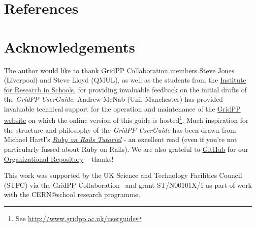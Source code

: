 \documentclass[12pt,a4paper]{iopart}
\begin{document}
\clearpage

%
%
\section*{References}


%

\newpage

\section*{Acknowledgements}
\label{sec:ack}
The author would like to thank GridPP Collaboration members Steve Jones
(Liverpool) and Steve Lloyd (QMUL), as well as the students from the
\href{http://researchinschools.org}{Institute for Research in Schools},
for providing invaluable feedback on the initial drafts of the
\emph{GridPP UserGuide}.
Andrew McNab (Uni. Manchester) has provided invaluable technical support
for the operation and maintenance of the
\href{http://www.gridpp.ac.uk}{GridPP website} on which the online
version of this guide is hosted\footnote{%
See \href{http://www.gridpp.ac.uk/userguide}{http://www.gridpp.ac.uk/userguide}}.
%
Much inspiration for the structure and
philosophy of the \emph{GridPP UserGuide} has been drawn from Michael
Hartl's \emph{\href{https://ww.railstutorial.org}{Ruby on Rails
Tutorial}} - an excellent read (even if you're not particularly fussed
about Ruby on Rails). We are also grateful to
\href{http://github.com}{GitHub} for our
\href{http://github.com/gridpp}{Organizational Repository} -- thanks!

This work was supported by the UK Science and Technology Facilities Council
(STFC) via the GridPP Collaboration~\cite{gridpp2006,gridpp2009}
and grant ST/N00101X/1 as part of work with the CERN@school research
programme.

\end{document}

